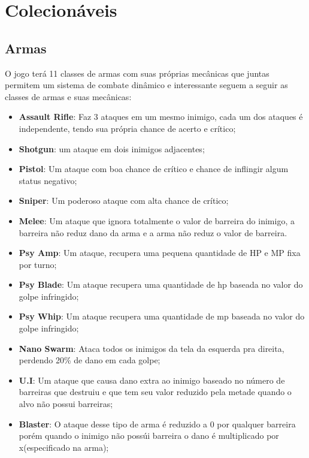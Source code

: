 \documentclass[11pt]{article} %
\begin{document}
\section{Colecionáveis}
\subsection{Armas}
 O jogo terá 11 classes de armas com suas próprias mecânicas que juntas permitem um sistema de combate dinâmico e interessante seguem a seguir as classes de armas e suas mecânicas:

\begin {itemize}
  \item \textbf{Assault Rifle}: Faz 3 ataques em um mesmo inimigo, cada um dos ataques é independente, tendo sua própria chance de acerto e crítico;

  \item \textbf{Shotgun}: um ataque em dois inimigos adjacentes;

  \item \textbf{Pistol}: Um ataque com boa chance de crítico e chance de inflingir algum status negativo;

  \item \textbf{Sniper}: Um poderoso ataque com alta chance de crítico;

  \item \textbf{Melee}: Um ataque que ignora totalmente o valor de barreira do inimigo, a barreira não reduz dano da arma e a arma não reduz o valor de barreira.

  \item \textbf{Psy Amp}: Um ataque, recupera uma pequena quantidade de HP e MP fixa por turno;

  \item \textbf{Psy Blade}: Um ataque recupera uma quantidade de hp baseada no valor do golpe infringido;

  \item \textbf{Psy Whip}: Um ataque recupera uma quantidade de mp baseada no valor do golpe infringido;

  \item \textbf{Nano Swarm}: Ataca todos os inimigos da tela da esquerda pra direita, perdendo 20\% de dano em cada golpe;

  \item \textbf{U.I}: Um ataque que causa dano extra ao inimigo baseado no número de barreiras que destruiu e que tem seu valor reduzido pela metade quando o alvo não possui barreiras;

  \item \textbf{Blaster}: O ataque desse tipo de arma é reduzido a 0 por qualquer barreira porém quando o inimigo não possúi barreira o dano é multiplicado por x(especificado na arma);
\end {itemize}
\end{document}
